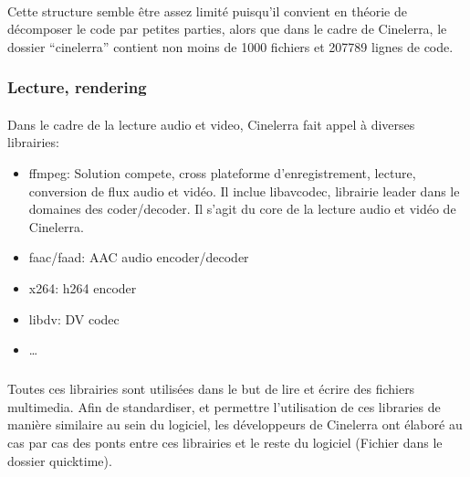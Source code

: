 \paragraph{}

Cette structure semble être assez limité puisqu'il convient en théorie
de décomposer le code par petites parties, alors que dans le cadre de
Cinelerra, le dossier ``cinelerra'' contient non  moins de 1000 fichiers
et 207789 lignes de code.

\subsubsection{Lecture, rendering}

\paragraph{}

Dans le cadre de la lecture audio et video, Cinelerra fait appel à
diverses librairies:

\begin{itemize}

  \item{ffmpeg: Solution compete, cross plateforme
  d'enregistrement, lecture, conversion de flux audio et vidéo. Il
  inclue libavcodec, librairie leader dans le domaines des
  coder/decoder.
Il s'agit du core de la
  lecture audio et vidéo de Cinelerra.}

  \item{faac/faad: AAC audio encoder/decoder}

  \item{x264: h264 encoder}

  \item{libdv: DV codec}

  \item{\ldots}

\end{itemize}

\subparagraph{}

Toutes ces librairies sont utilisées dans le but de lire et écrire des
fichiers multimedia. Afin de standardiser, et permettre l'utilisation de
ces libraries de manière similaire au sein du logiciel, les développeurs
de Cinelerra ont élaboré au cas par cas des ponts entre ces librairies
et le reste du logiciel (Fichier dans le dossier quicktime).


